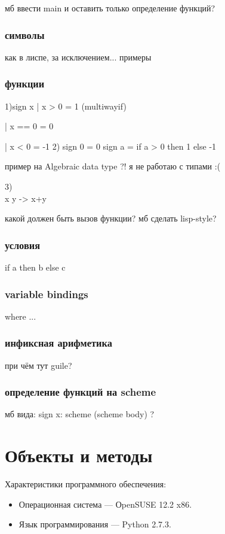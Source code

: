 \documentclass[12pt,a4paper,oneside]{extarticle}
\begin{document}
        мб ввести main и оставить только определение функций?

        \subsubsection{символы}
            как в лиспе, за исключением... 
            примеры
        \subsubsection{функции}
            1)sign x  | x > 0  = 1 (multiwayif)

                | x == 0 = 0

                | x < 0  = -1
            2) sign 0 = 0 
            sign a = if a > 0 then 1 else -1

            пример на Algebraic data type ?! я не работаю с типами :(

            3) \\x y -> x+y 

            какой должен быть вызов функции? мб сделать lisp-style?
        \subsubsection{условия}
            if a then b else c

        \subsubsection{variable bindings}
            where ...
        \subsubsection{инфиксная арифметика}
            при чём тут guile?
        \subsubsection{определение функций на scheme}
            мб вида: sign x: scheme (scheme body) ?

        
\clearpage

\section{Объекты и методы}
\label{sec:configuration} 
        \noindent Характеристики программного обеспечения:
        \begin{itemize}
            \item Операционная система --- ОpenSUSE 12.2 x86.
            \item Язык программирования --- Python 2.7.3.
        \end{itemize}
        
\end{document}
